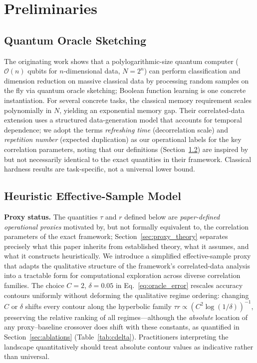 \documentclass[sensors,article,submit,pdftex,moreauthors]{Definitions/mdpi}
\newcommand{\bigO}{\mathcal{O}}
\providecommand{\DIFadd}[1]{{\protect\color{blue}#1}} %
\providecommand{\DIFdel}[1]{} %
\providecommand{\DIFaddbegin}{} %
\providecommand{\DIFaddend}{} %
\providecommand{\DIFdelbegin}{} %
\providecommand{\DIFdelend}{} %
\begin{document}
\section{Preliminaries}
\label{sec:prelim}

\subsection{Quantum Oracle Sketching}

The originating work \citep{zhao2026exponential} shows that a polylogarithmic-size quantum computer ($\bigO(n)$ qubits for $n$-dimensional data, $N = 2^n$) can perform classification and dimension reduction on massive classical data by processing random samples on the fly via quantum oracle sketching; Boolean function learning is one concrete instantiation. For several concrete tasks, the classical memory requirement scales polynomially in $N$, yielding an exponential memory gap. Their correlated-data extension uses a structured data-generation model that accounts for temporal dependence; we adopt the terms \emph{refreshing time} (decorrelation scale) and \emph{repetition number} (expected duplication) as our operational labels for the key correlation parameters, noting that our definitions (Section~\ref{sec:heuristic_model}) are inspired by but not necessarily identical to the exact quantities in their framework. Classical hardness results are task-specific, not a universal lower bound.

\subsection{Heuristic Effective-Sample Model}
\label{sec:heuristic_model}

\textbf{Proxy status.} The quantities $\tau$ and $r$ defined below are \emph{paper-defined operational proxies} motivated by, but not formally equivalent to, the correlation parameters of the exact framework; \DIFdelbegin \DIFdel{equivalence proofs are follow-on work}\DIFdelend \DIFaddbegin \DIFadd{Section~\ref{sec:proxy_theory} separates precisely what this paper inherits from established theory, what it assumes, and what it constructs heuristically}\DIFaddend . We introduce a simplified effective-sample proxy that adapts the qualitative structure of the framework's correlated-data analysis into a tractable form for computational exploration across diverse correlation families. The choice $C{=}2$, $\delta{=}0.05$ in Eq.~\eqref{eq:oracle_error} rescales accuracy contours uniformly without deforming the qualitative regime ordering: changing $C$ or $\delta$ shifts every contour along the hyperbolic family $\tau r \propto (C^2 \log(1/\delta))^{-1}$, preserving the relative ranking of all \DIFdelbegin \DIFdel{regimes}\DIFdelend \DIFaddbegin \DIFadd{regimes---although the }\emph{\DIFadd{absolute}} \DIFadd{location of any proxy--baseline crossover does shift with these constants, as quantified in Section~\ref{sec:ablations} (Table~\ref{tab:cdelta})}\DIFaddend . Practitioners interpreting the landscape quantitatively should treat absolute contour values as indicative rather than universal.
\end{document}
